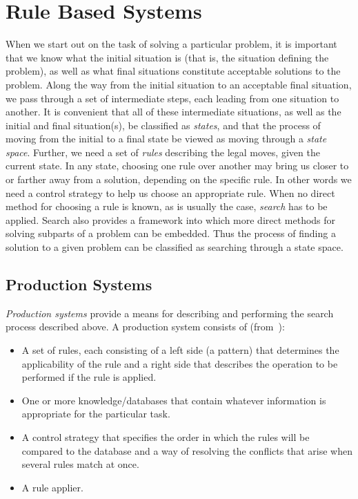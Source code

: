 
\section{Rule Based Systems}
\label{rbs}

When we start out on the task of solving a particular problem, it is
important that we know what the initial situation is (that is, the
situation defining the problem), as well as what final situations
constitute acceptable solutions to the problem. Along the way from the
initial situation to an acceptable final situation, we pass through a
set of intermediate steps, each leading from one situation to another.
It is convenient that all of these intermediate situations, as well as
the initial and final situation(s), be classified as {\em states\/},
and that the process of moving from the initial to a final state be
viewed as moving through a {\em state space\/}. Further, we need a set
of {\em rules\/} describing the legal moves, given the current state.
In any state, choosing one rule over another may bring us closer to or
farther away from a solution, depending on the specific rule. In other
words we need a control strategy to help us choose an appropriate
rule. When no direct method for choosing a rule is known, as is
usually the case, {\em search\/} has to be applied.  Search also
provides a framework into which more direct methods for solving
subparts of a problem can be embedded. Thus the process of finding a
solution to a given problem can be classified as searching through a
state space.

\subsection{Production Systems}
\label{prodsys}

{\em Production systems\/} provide a means for describing and
performing the search process described above. A production system
consists of (from~\cite{rich}):

\begin{itemize}
  \item A set of rules, each consisting of a left side (a pattern)
    that determines the applicability of the rule and a right side
    that describes the operation to be performed if the rule is
    applied.
  \item One or more knowledge/databases that contain whatever
    information is appropriate for the particular task.
  \item A control strategy that specifies the order in which the
    rules will be compared to the database and a way of resolving the
    conflicts that arise when several rules match at once.
  \item A rule applier.
\end{itemize}

